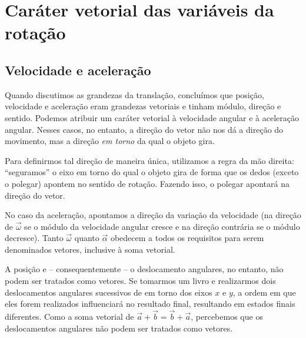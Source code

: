 \section{Caráter vetorial das variáveis da rotação}

\subsection{Velocidade e aceleração}

Quando discutimos as grandezas da translação, concluímos que posição, velocidade e aceleração eram grandezas vetoriais e tinham módulo, direção e sentido. Podemos atribuir um caráter vetorial à velocidade angular e à aceleração angular. Nesses casos, no entanto, a direção do vetor não nos dá a direção do movimento, mas a direção \emph{em torno} da qual o objeto gira.

Para definirmos tal direção de maneira única, utilizamos a regra da mão direita: ``seguramos'' o eixo em torno do qual o objeto gira de forma que os dedos (exceto o polegar) apontem no sentido de rotação. Fazendo isso, o polegar apontará na direção do vetor.

No caso da aceleração, apontamos a direção da variação da velocidade (na direção de $\vec{\omega}$ se o módulo da velocidade angular cresce e na direção contrária se o módulo decresce). Tanto $\vec{\omega}$ quanto $\vec{\alpha}$ obedecem a todos os requisitos para serem denominados vetores, inclusive à soma vetorial.

A posição e -- consequentemente -- o deslocamento angulares, no entanto, não podem ser tratados como vetores. Se tomarmos um livro e realizarmos dois deslocamentos angulares sucessivos de  em torno dos eixos $x$ e $y$, a ordem em que eles forem realizados influenciará no resultado final, resultando em estados finais diferentes. Como a soma vetorial de $\vec{a} + \vec{b} = \vec{b} + \vec{a}$, percebemos que os deslocamentos angulares não podem ser tratados como vetores.


